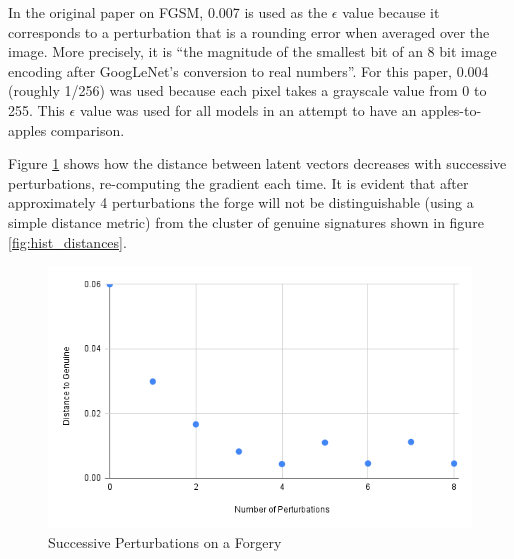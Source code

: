 In the original paper on FGSM, 0.007 is used as the $\epsilon$ value because it corresponds to a perturbation that is a rounding error when averaged over the image.
More precisely, it is ``the magnitude of the smallest bit of an 8 bit image encoding after GoogLeNet's conversion to real numbers''\cite{goodfellow}.
For this paper, 0.004 (roughly 1/256) was used because each pixel takes a grayscale value from 0 to 255.
This $\epsilon$ value was used for all models in an attempt to have an apples-to-apples comparison.

Figure \ref{fig:dist_vs_perts} shows how the distance between latent vectors decreases with successive perturbations, re-computing the gradient each time.
It is evident that after approximately 4 perturbations the forge will not be distinguishable (using a simple distance metric) from the cluster of genuine signatures shown in figure \ref{fig:hist_distances}.
\begin{figure}[h]
    \begin{center}
        \includegraphics[width=0.8\linewidth]{dist_pert_plot.png}
    \end{center}
    \caption{Successive Perturbations on a Forgery}
    \label{fig:dist_vs_perts}
\end{figure}

